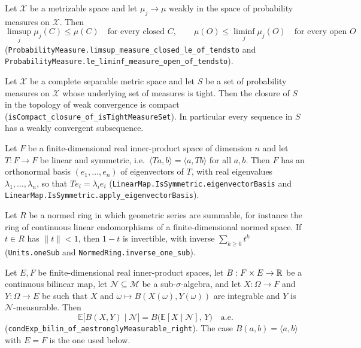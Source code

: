 \begin{proposition}[Portmanteau]
Let $\mathcal X$ be a metrizable space and let $\mu_j\to\mu$ weakly in the space
of probability measures on $\mathcal X$. Then
\[
  \limsup_j\mu_j(C)\le\mu(C)\quad\text{for every closed }C,\qquad
  \mu(O)\le\liminf_j\mu_j(O)\quad\text{for every open }O
\]
(\texttt{ProbabilityMeasure.limsup\_measure\_closed\_le\_of\_tendsto} and
\texttt{ProbabilityMeasure.le\_liminf\_measure\_open\_of\_tendsto}).
\end{proposition}

\begin{proposition}
Let $\mathcal X$ be a complete separable metric space and let $S$ be a set of
probability measures on $\mathcal X$ whose underlying set of measures is tight.
Then the closure of $S$ in the topology of weak convergence is compact
(\texttt{isCompact\_closure\_of\_isTightMeasureSet}). In particular every
sequence in $S$ has a weakly convergent subsequence.
\end{proposition}

\begin{proposition}
Let $F$ be a finite-dimensional real inner-product space of dimension $n$ and
let $T:F\to F$ be linear and symmetric, i.e.\ $\langle Ta,b\rangle=\langle
a,Tb\rangle$ for all $a,b$. Then $F$ has an orthonormal basis
$(e_1,\dots,e_n)$ of eigenvectors of $T$, with real eigenvalues
$\lambda_1,\dots,\lambda_n$, so that $Te_i=\lambda_ie_i$
(\texttt{LinearMap.IsSymmetric.eigenvectorBasis} and
\texttt{LinearMap.IsSymmetric.apply\_eigenvectorBasis}).
\end{proposition}

\begin{proposition}
Let $R$ be a normed ring in which geometric series are summable, for instance
the ring of continuous linear endomorphisms of a finite-dimensional normed
space. If $t\in R$ has $\|t\|<1$, then $1-t$ is invertible, with inverse
$\sum_{k\ge0}t^k$ (\texttt{Units.oneSub} and
\texttt{NormedRing.inverse\_one\_sub}).
\end{proposition}

\begin{proposition}
Let $E,F$ be finite-dimensional real inner-product spaces, let
$B:F\times E\to\mathbb{R}$ be a continuous bilinear map, let
$\mathcal N\subseteq\mathcal M$ be a sub-$\sigma$-algebra, and let
$X:\Omega\to F$ and $Y:\Omega\to E$ be such that $X$ and
$\omega\mapsto B(X(\omega),Y(\omega))$ are integrable and $Y$ is
$\mathcal N$-measurable. Then
\[
  \mathbb E\bigl[B(X,Y)\mid\mathcal N\bigr]
    =B\bigl(\mathbb E[X\mid\mathcal N],\,Y\bigr)\quad\text{a.e.}
\]
(\texttt{condExp\_bilin\_of\_aestronglyMeasurable\_right}). The case
$B(a,b)=\langle a,b\rangle$ with $E=F$ is the one used below.
\end{proposition}
